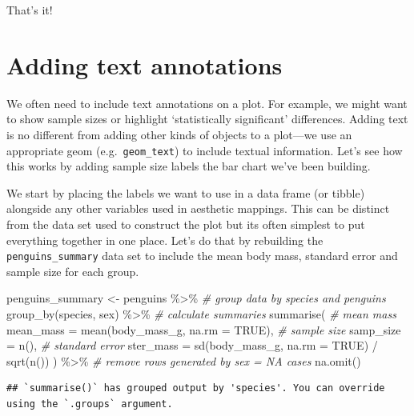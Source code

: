 \documentclass[
]{book}
\newenvironment{Shaded}{\begin{snugshade}}{\end{snugshade}}
\newcommand{\AttributeTok}[1]{\textcolor[rgb]{0.77,0.63,0.00}{#1}}
\newcommand{\CommentTok}[1]{\textcolor[rgb]{0.56,0.35,0.01}{\textit{#1}}}
\newcommand{\ConstantTok}[1]{\textcolor[rgb]{0.00,0.00,0.00}{#1}}
\newcommand{\FunctionTok}[1]{\textcolor[rgb]{0.00,0.00,0.00}{#1}}
\newcommand{\NormalTok}[1]{#1}
\newcommand{\OtherTok}[1]{\textcolor[rgb]{0.56,0.35,0.01}{#1}}
\newcommand{\SpecialCharTok}[1]{\textcolor[rgb]{0.00,0.00,0.00}{#1}}
\begin{document}
That's it!

\hypertarget{adding-text-annotations}{%
\section{Adding text annotations}\label{adding-text-annotations}}

We often need to include text annotations on a plot. For example, we might want to show sample sizes or highlight `statistically significant' differences. Adding text is no different from adding other kinds of objects to a plot---we use an appropriate geom (e.g.~\texttt{geom\_text}) to include textual information. Let's see how this works by adding sample size labels the bar chart we've been building.

We start by placing the labels we want to use in a data frame (or tibble) alongside any other variables used in aesthetic mappings. This can be distinct from the data set used to construct the plot but its often simplest to put everything together in one place. Let's do that by rebuilding the \texttt{penguins\_summary} data set to include the mean body mass, standard error and sample size for each group.

\begin{Shaded}
\begin{Highlighting}[]
\NormalTok{penguins\_summary }\OtherTok{\textless{}{-}}\NormalTok{ penguins }\SpecialCharTok{\%\textgreater{}\%} 
  \CommentTok{\# group data by species and penguins}
  \FunctionTok{group\_by}\NormalTok{(species, sex) }\SpecialCharTok{\%\textgreater{}\%} 
  \CommentTok{\# calculate summaries}
  \FunctionTok{summarise}\NormalTok{(}
    \CommentTok{\# mean mass}
    \AttributeTok{mean\_mass =} \FunctionTok{mean}\NormalTok{(body\_mass\_g, }\AttributeTok{na.rm =} \ConstantTok{TRUE}\NormalTok{),}
    \CommentTok{\# sample size}
    \AttributeTok{samp\_size =} \FunctionTok{n}\NormalTok{(),}
    \CommentTok{\# standard error}
    \AttributeTok{ster\_mass =} \FunctionTok{sd}\NormalTok{(body\_mass\_g, }\AttributeTok{na.rm =} \ConstantTok{TRUE}\NormalTok{) }\SpecialCharTok{/} \FunctionTok{sqrt}\NormalTok{(}\FunctionTok{n}\NormalTok{())}
\NormalTok{  ) }\SpecialCharTok{\%\textgreater{}\%} 
  \CommentTok{\# remove rows generated by sex = NA cases}
  \FunctionTok{na.omit}\NormalTok{()}
\end{Highlighting}
\end{Shaded}

\begin{verbatim}
## `summarise()` has grouped output by 'species'. You can override using the `.groups` argument.
\end{verbatim}
\end{document}
